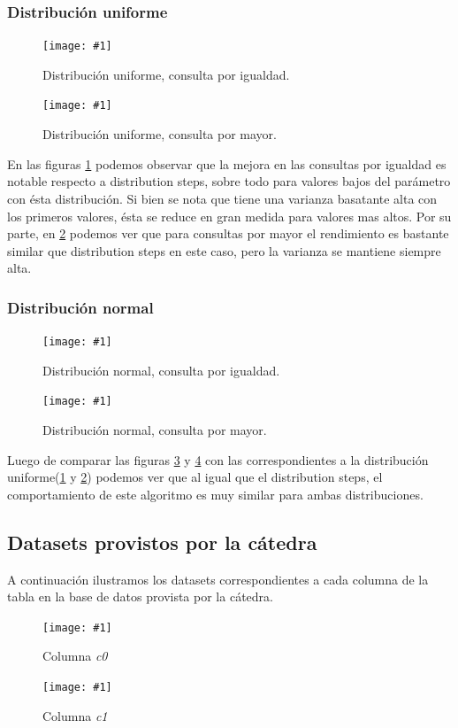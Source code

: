 \documentclass[a4paper, 10pt, twoside]{article}
\newcommand{\grafico}[3]{
  \begin{figure}[H]
    \texttt{[image: \#1]}
    \caption{#2}
    \label{#3}
  \end{figure}
}
\begin{document}
\subsubsection{Distribución uniforme}

\grafico{plot-custom-uniform-equal}
        {Distribución uniforme, consulta por igualdad.}
        {plot-custom-uniform-equal}
\grafico{plot-custom-uniform-greater}
        {Distribución uniforme, consulta por mayor.}
        {plot-custom-uniform-greater}

En las figuras \ref{plot-custom-uniform-equal} podemos observar que la mejora en las consultas por igualdad es notable respecto a distribution steps, 
sobre todo para valores bajos del parámetro con ésta distribución. Si bien se nota que tiene una varianza basatante alta con los primeros valores, ésta se reduce en gran medida para valores mas altos.
Por su parte, en \ref{plot-custom-uniform-greater} podemos ver que para consultas por mayor el rendimiento es bastante similar que distribution steps en este caso, pero la varianza se mantiene siempre alta.

\subsubsection{Distribución normal}        

\grafico{plot-custom-normal-equal}
        {Distribución normal, consulta por igualdad.}
        {plot-custom-normal-equal}
\grafico{plot-custom-normal-greater}
        {Distribución normal, consulta por mayor.}
        {plot-custom-normal-greater}

Luego de comparar las figuras \ref{plot-custom-normal-equal} y \ref{plot-custom-normal-greater} con las correspondientes a la distribución uniforme(\ref{plot-custom-uniform-equal} y \ref{plot-custom-uniform-greater}) podemos ver que al igual que el distribution steps, el comportamiento de este algoritmo es muy similar para ambas distribuciones.

\subsection{Datasets provistos por la cátedra}

A continuación ilustramos los datasets correspondientes a cada columna de la tabla en la base de datos provista por la cátedra.

\grafico{dataset-c0}
        {Columna \emph{c0}}
        {dataset-columna-c0}

\grafico{dataset-c1}
        {Columna \emph{c1}}
        {dataset-columna-c1}
\end{document}
